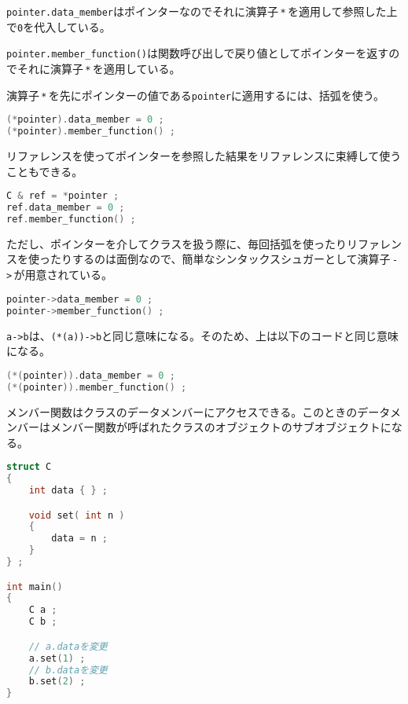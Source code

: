 \texttt{pointer.data\_member}はポインターなのでそれに演算子\,\texttt{*}\,を適用して参照した上で\texttt{0}を代入している。

\texttt{pointer.member\_function()}は関数呼び出しで戻り値としてポインターを返すのでそれに演算子\,\texttt{*}\,を適用している。

演算子\,\texttt{*}\,を先にポインターの値である\texttt{pointer}に適用するには、括弧を使う。

\begin{lstlisting}[language={C++}]
(*pointer).data_member = 0 ;
(*pointer).member_function() ;
\end{lstlisting}

リファレンスを使ってポインターを参照した結果をリファレンスに束縛して使うこともできる。

\begin{lstlisting}[language={C++}]
C & ref = *pointer ;
ref.data_member = 0 ;
ref.member_function() ;
\end{lstlisting}

ただし、ポインターを介してクラスを扱う際に、毎回括弧を使ったりリファレンスを使ったりするのは面倒なので、簡単なシンタックスシュガーとして演算子\,\texttt{->}\,が用意されている。

\begin{lstlisting}[language={C++}]
pointer->data_member = 0 ;
pointer->member_function() ;
\end{lstlisting}

\texttt{a->b}は、\texttt{(*(a))->b}と同じ意味になる。そのため、上は以下のコードと同じ意味になる。

\begin{lstlisting}[language={C++}]
(*(pointer)).data_member = 0 ;
(*(pointer)).member_function() ;
\end{lstlisting}

\clearpage
{}

メンバー関数はクラスのデータメンバーにアクセスできる。このときのデータメンバーはメンバー関数が呼ばれたクラスのオブジェクトのサブオブジェクトになる。

\begin{lstlisting}[language={C++}]
struct C
{
    int data { } ;

    void set( int n )
    {
        data = n ;
    }
} ;

int main()
{
    C a ;
    C b ;

    // a.dataを変更
    a.set(1) ;
    // b.dataを変更
    b.set(2) ;
}
\end{lstlisting}

